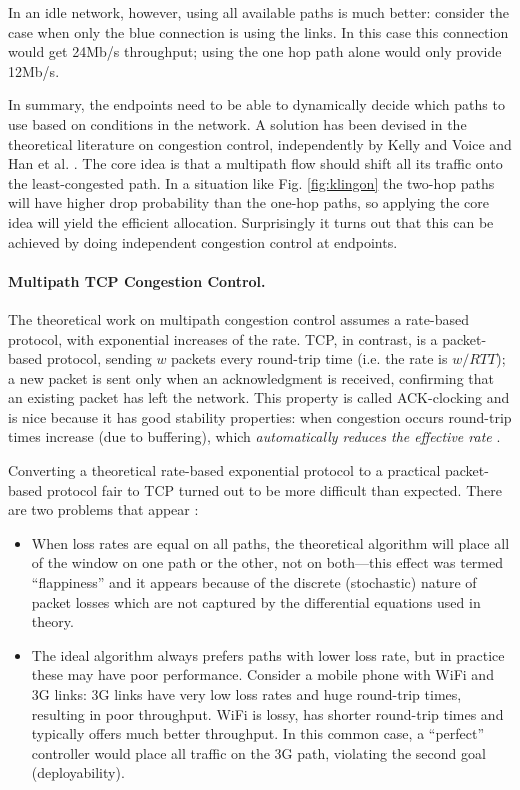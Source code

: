 In an idle network, however, using all available paths is much better: 
consider the case when only the blue connection is using the links. In this
case this connection would get 24Mb/s throughput; using the one hop path
alone would only provide 12Mb/s.

In summary, the endpoints need to be able to dynamically decide 
which paths to use based on conditions in the network. 
A solution has been devised in the theoretical literature on
congestion control, independently by Kelly and Voice \cite{kelly-voice} and
Han et al. \cite{towsley-cc}.  The core idea is that a multipath flow should
shift all its traffic onto the least-congested path.
In a situation like Fig. \ref{fig:klingon} the
two-hop paths will have higher drop probability than the one-hop
paths, so applying the core idea will yield the efficient
allocation.
Surprisingly it turns out that this can be achieved by doing independent
congestion control at endpoints.

\paragraph{Multipath TCP Congestion Control.}
The theoretical work on multipath congestion control \cite{kelly-voice,towsley-cc} assumes a rate-based
protocol, with exponential increases of the rate. TCP, in contrast, is a packet-based
protocol, sending $w$ packets every round-trip time (i.e. the rate is $w/RTT$); 
a new packet is sent only when an acknowledgment is received, confirming that an existing 
packet has left the network. This property is called ACK-clocking 
and is nice because it has good stability properties:
when congestion occurs round-trip times increase (due to buffering), which
\emph{automatically reduces the effective rate} \cite{Jacobson_congestion:88}.


Converting a theoretical rate-based exponential protocol to a practical 
packet-based protocol fair to TCP turned out to be more difficult than expected. 
There are two problems that appear \cite{mptcp-cc}: 
\begin{itemize}
\item When loss rates are equal on all paths, the theoretical algorithm will
place all of the window on one path or the other, not on both---this effect was termed 
``flappiness'' and it appears because of the discrete (stochastic) nature of packet losses which
are not captured by the differential equations used in theory.
\item The ideal algorithm always prefers paths with lower loss rate, but in practice these may have poor
performance. Consider a mobile phone with WiFi and 3G links: 3G links have very low loss rates and huge round-trip
times, resulting in poor throughput. WiFi is lossy, has shorter round-trip times and typically offers much better throughput.
In this common case, a ``perfect'' controller would place all traffic on the 3G path, violating the second goal (deployability).
\end{itemize}

